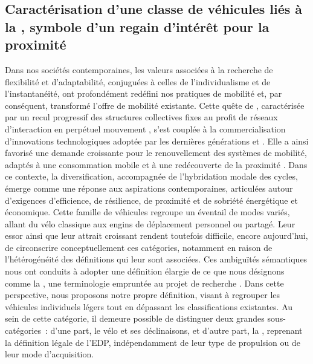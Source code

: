 \begin{refsegment}
\subsection{Caractérisation d’une classe de véhicules liés à la , symbole d'un regain d'intérêt pour la proximité
    \label{chap1:caracterisation-mobilite-individuelle-legere}
    }

Dans nos sociétés contemporaines, les valeurs associées à la recherche de flexibilité et d'adaptabilité, conjuguées à celles de l'individualisme et de l'instantanéité, ont profondément redéfini nos pratiques de mobilité et, par conséquent, transformé l’offre de mobilité existante. Cette quête de , caractérisée par un recul progressif des structures collectives fixes au profit de réseaux d’interaction en perpétuel mouvement \textcolor{blue}{\autocite[19-24]{bauman_liquid_2000}}, s’est couplée à la commercialisation d'innovations technologiques adoptée par les dernières générations  et . Elle a ainsi favorisé une demande croissante pour le renouvellement des systèmes de mobilité, adaptés à une consommation mobile et à une redécouverte de la proximité \textcolor{blue}{\autocite[103-108]{bu_tout-voiture_2024}}. Dans ce contexte, la diversification, accompagnée de l’hybridation modale des cycles, émerge comme une réponse aux aspirations contemporaines, articulées autour d’exigences d’efficience, de résilience, de proximité et de sobriété énergétique et économique. Cette famille de véhicules regroupe un éventail de modes variés, allant du vélo classique aux engins de déplacement personnel ou partagé. Leur essor ainsi que leur attrait croissant rendent toutefois difficile, encore aujourd’hui, de circonscrire conceptuellement ces catégories, notamment en raison de l'hétérogénéité des définitions qui leur sont associées. Ces ambiguïtés sémantiques nous ont conduits à adopter une définition élargie de ce que nous désignons comme la , une terminologie empruntée au projet de recherche \textcolor{blue}{\textcite{urfe_projet_2022}}. Dans cette perspective, nous proposons notre propre définition, visant à regrouper les véhicules individuels légers tout en dépassant les classifications existantes. Au sein de cette catégorie, il demeure possible de distinguer deux grandes sous-catégories~: d’une part, le vélo et ses déclinaisons, et d’autre part, la , reprenant la définition légale de l'\acrfull{EDP}, indépendamment de leur type de propulsion ou de leur mode d’acquisition.%


\end{refsegment}
